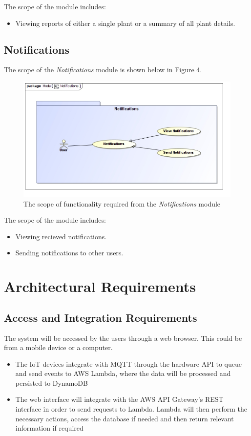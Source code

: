 \documentclass{article}
\begin{document}
		The scope of the \emph{} module includes:
		
		\begin{itemize}
			\item Viewing reports of either a single plant or a summary of all plant details.
		\end{itemize}
		
	\pagebreak
	\subsection{Notifications}
		The scope of the \emph{Notifications} module is shown below in Figure 4.
		
		\begin{figure}[H]
			\centering
			\includegraphics[width=\textwidth]{Notifications.jpg}
			\caption{The scope of functionality required from the \emph{Notifications} module}
		\end{figure}
		
		The scope of the \emph{} module includes:
		
		\begin{itemize}
			\item Viewing recieved notifications.
			\item Sending notifications to other users.
		\end{itemize}

\cleardoublepage

\section{Architectural Requirements}
\subsection{Access and Integration Requirements}
The system will be accessed by the users through a web browser. This could be from a mobile device or a computer. 
\begin{itemize}
	\item The IoT devices integrate with MQTT through the hardware API to queue and send events to AWS Lambda, where the data will be processed and persisted to DynamoDB
	\item The web interface will integrate with the AWS API Gateway's REST interface in order to send requests to Lambda. Lambda will then perform the necessary actions, access the database if needed and then return relevant information if required
\end{itemize} 
\end{document}
